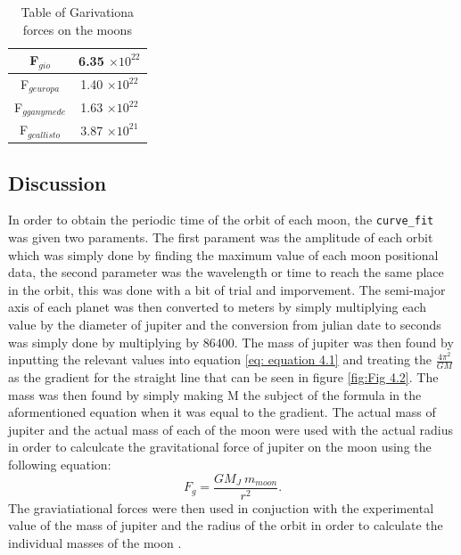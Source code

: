 \documentclass[12pt, a4paper]{article}
\begin{document}
\begin{table}[H]
    \centering
    \begin{tabular}{|c|c|}
    \hline
    F\(_{g io}\) & 6.35 \(\times 10^{22}\) \\ \hline
    F\(_{g europa}\) & 1.40 \(\times 10^{22}\) \\ \hline
    F\(_{g ganymede}\) & 1.63 \(\times 10^{22}\) \\ \hline
    F\(_{g callisto}\) & 3.87 \(\times 10^{21}\) \\ \hline
    \end{tabular}
    \caption{Table of Garivationa forces on the moons}
    \label{tab: Table 4.3}
\end{table}

\subsection{Discussion}
In order to obtain the periodic time of the orbit of each moon, the \texttt{curve_fit} was given two paraments. The first parament was the amplitude of each orbit which was simply done by finding the maximum value of each moon positional data, the second parameter was the wavelength or time to reach the same place in the orbit, this was done with a bit of trial and imporvement. The semi-major axis of each planet was then converted to meters by simply multiplying each value by the diameter of jupiter and the conversion from julian date to seconds was simply done by multiplying by \(86400\). The mass of jupiter was then found by inputting the relevant values into equation \ref{eq: equation 4.1} and treating the \(\frac{4\pi^2}{GM}\) as the gradient for the straight line that can be seen in figure \ref{fig:Fig 4.2}. The mass was then found by simply making M the subject of the formula in the aformentioned equation when it was equal to the gradient. The actual mass of jupiter and the actual mass of each of the moon were used with the actual radius in order to calculcate the gravitational force of jupiter on the moon using the following equation:
\begin{equation}
    F_g = \frac{GM_J~m_{moon}}{r^2} .
\end{equation}
The graviatiational forces were then used in conjuction with the experimental value of the mass of jupiter and the radius of the orbit in order to calculate the individual masses of the moon \parencite{muncaster}. 
\end{document}
